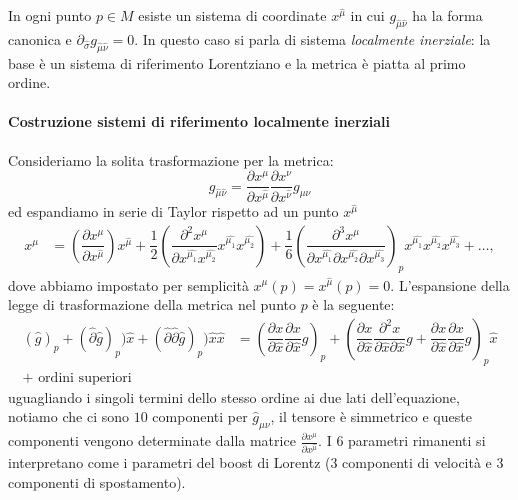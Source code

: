 \documentclass[twoside]{article}
\begin{document}
In ogni punto $p\in M$ esiste un sistema di coordinate $x^{\hat{\mu}}$ in cui $g_{\hat{\mu}\hat{\nu}}$ ha la forma canonica e $\partial_{\hat{\sigma}}g_{\hat{\mu} \hat{\nu}}=0$. In questo caso si parla di sistema \emph{localmente inerziale}: la base è un sistema di riferimento Lorentziano e la metrica è piatta al primo ordine.

\paragraph{Costruzione sistemi di riferimento localmente inerziali}

Consideriamo la solita trasformazione per la metrica:
\begin{equation*}
	g_{\hat{\mu} \hat{\nu}} = \dfrac{\partial x^\mu}{\partial x^{\hat{\mu}}} \dfrac{\partial x^\nu}{\partial x^{\hat{\nu}}} g_{\mu \nu}
\end{equation*}
ed espandiamo in serie di Taylor rispetto ad un punto $x^{\hat \mu}$
\begin{align*}
	x^\mu & = \left ( \dfrac{\partial x^\mu}{\partial x^{\hat{\mu}}}\right)x^{\hat{\mu}}
	 + \dfrac{1}{2} \left( \dfrac{\partial^2 x^{\mu}}{\partial x^{\hat{\mu_1}}x^{\hat{\mu_2}}} x^{\hat{\mu_1}}x^{\hat{\mu_2}}\right) + \dfrac{1}{6}\left( \dfrac{\partial^3 x^\mu}{\partial x^{\hat{\mu_1}}\partial x^{\hat{\mu_2}}\partial x^{\hat{\mu_3}}}\right)_p x^{\hat{\mu_1}}x^{\hat{\mu_2}}x^{\hat{\mu_3}} + \ldots,
\end{align*}
dove abbiamo impostato per semplicità $x^\mu(p)=x^{\hat{\mu}}(p)=0$. L'espansione della legge di trasformazione della metrica nel punto $p$ è la seguente:
\begin{align*}
	(\hat{g})_p + (\hat{\partial}\hat{g})_p) \hat{x} + (\hat{\partial}\hat{\partial}\hat{g})_p)\hat{x}\hat{x} &=
	\left( \dfrac{\partial x}{\partial \hat{x}}\dfrac{\partial x}{\partial \hat{x}} g\right)_p + 
	\left( \dfrac{\partial x}{\partial \hat{x}} \dfrac{\partial^2 x}{\partial \hat{x} \partial \hat{x}}g + 
	\dfrac{\partial x}{\partial \hat{x}} \dfrac{\partial x}{\partial \hat{x}} g \right)_p \hat{x} \\
	 + \textrm{ ordini superiori}
\end{align*}
uguagliando i singoli termini dello stesso ordine ai due lati dell'equazione, notiamo che ci sono $10$ componenti per $\hat{g}_{\mu \nu}$, il tensore è simmetrico e queste componenti vengono determinate dalla matrice $\frac{\partial x^\mu}{\partial x^{\hat{\mu}}}$. I 6 parametri rimanenti si interpretano come i parametri del boost di Lorentz (3 componenti di velocità e 3 componenti di spostamento). 
\end{document}
